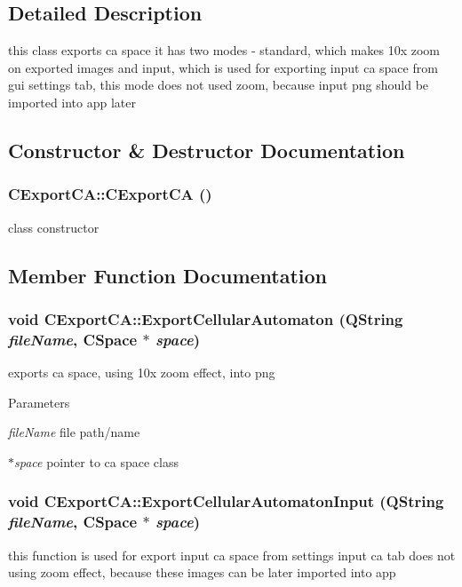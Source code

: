 \subsection{Detailed Description}
this class exports ca space it has two modes -\/ standard, which makes 10x zoom on exported images and input, which is used for exporting input ca space from gui settings tab, this mode does not used zoom, because input png should be imported into app later 

\subsection{Constructor \& Destructor Documentation}
\hypertarget{classCExportCA_a53f333999ac0fbc58f80058d27518502}{
\subsubsection[{CExportCA}]{\setlength{\rightskip}{0pt plus 5cm}CExportCA::CExportCA ()}}
\label{classCExportCA_a53f333999ac0fbc58f80058d27518502}
class constructor 

\subsection{Member Function Documentation}
\hypertarget{classCExportCA_a9bc0574ebc0672985fb7700c5a5d04a9}{
\subsubsection[{ExportCellularAutomaton}]{\setlength{\rightskip}{0pt plus 5cm}void CExportCA::ExportCellularAutomaton (QString {\em fileName}, \/  {\bf CSpace} $\ast$ {\em space})}}
\label{classCExportCA_a9bc0574ebc0672985fb7700c5a5d04a9}
exports ca space, using 10x zoom effect, into png


\begin{DoxyParams}{Parameters}
\item[{\em fileName}]file path/name \item[{\em $\ast$space}]pointer to ca space class \end{DoxyParams}
\hypertarget{classCExportCA_ad805bf09d9c72c60ba662d4d9d2fe117}{
\subsubsection[{ExportCellularAutomatonInput}]{\setlength{\rightskip}{0pt plus 5cm}void CExportCA::ExportCellularAutomatonInput (QString {\em fileName}, \/  {\bf CSpace} $\ast$ {\em space})}}
\label{classCExportCA_ad805bf09d9c72c60ba662d4d9d2fe117}
this function is used for export input ca space from settings input ca tab does not using zoom effect, because these images can be later imported into app


